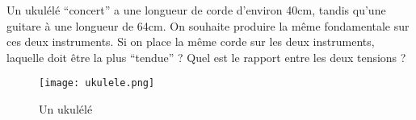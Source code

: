 %
%
    Un ukulélé \enquote{concert} a une longueur de corde d'environ 40cm, tandis qu'une guitare à une longueur de 64cm. On souhaite produire la même fondamentale sur ces deux instruments. Si on place la même corde sur les deux instruments, laquelle doit être la plus \enquote{tendue} ? Quel est le rapport entre les deux tensions ?
    \begin{figure}[ht!]
        \centering
        \texttt{[image: ukulele.png]}
        \caption{Un ukulélé}
    \end{figure}
